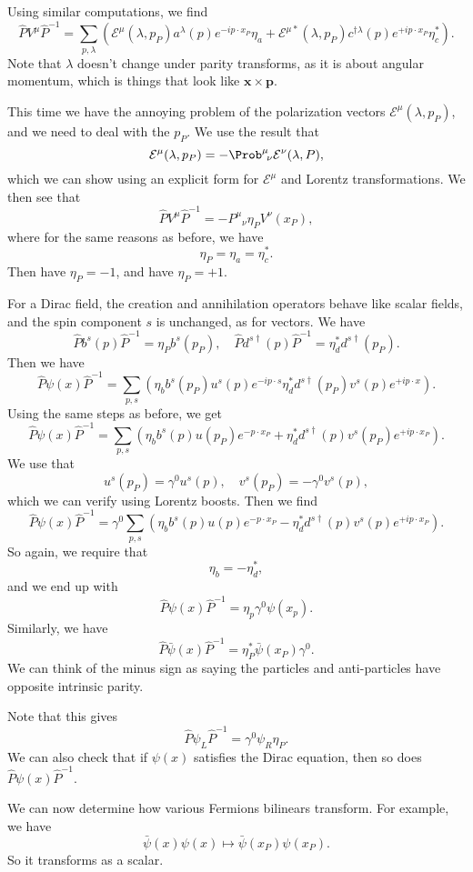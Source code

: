 \documentclass[a4paper]{article}
\begin{document}
Using similar computations, we find
\[
  \hat{P} V^\mu \hat{P}^{-1} = \sum_{p, \lambda} \left(\mathcal{E}^\mu (\lambda, p_P)a^\lambda(p) e^{-ip\cdot x_P} \eta_a + \mathcal{E}^{\mu*}(\lambda, p_P) c^{\dagger\lambda} (p) e^{+ip\cdot x_P} \eta_c^*\right).
\]
Note that $\lambda$ doesn't change under parity transforms, as it is about angular momentum, which is things that look like $\mathbf{x} \times \mathbf{p}$.

This time we have the annoying problem of the polarization vectors $\mathcal{E}^\mu(\lambda, p_P)$, and we need to deal with the $p_P$. We use the result that
\[
  \mathcal{E}^\mu(\lambda,  p_P) = - \Prob^\mu\!_\nu \mathcal{E}^\nu (\lambda, P),
\]
which we can show using an explicit form for $\mathcal{E}^\mu$ and Lorentz transformations. We then see that
\[
  \hat{P} V^\mu \hat{P}^{-1} = - P^\mu\!_\nu \eta_P V^\nu(x_P),
\]
where for the same reasons as before, we have
\[
  \eta_P = \eta_a = \eta_c^*.
\]
Then  have $\eta_P = -1$, and  have $\eta_P = +1$.

\separator

For a Dirac field, the creation and annihilation operators behave like scalar fields, and the spin component $s$ is unchanged, as for vectors. We have
\[
  \hat{P} b^s(p) \hat{P}^{-1} = \eta_P b^s(p_P),\quad \hat{P} d^{s\dagger}(p) \hat{P}^{-1} = \eta_d^* d^{s\dagger}(p_P).
\]
Then we have
\[
  \hat{P} \psi(x) \hat{P}^{-1} = \sum_{p, s} \left(\eta_b b^s(p_P) u^s(p) e^{-ip\cdot s} \eta_d^* d^{s\dagger} (p_P) v^s(p) e^{+ip\cdot x}\right).
\]
Using the same steps as before, we get
\[
  \hat{P}\psi(x) \hat{P}^{-1} = \sum_{p, s}\left( \eta_b b^s(p) u(p_P) e^{-p\cdot x_P} + \eta_d^* d^{s\dagger}(p) v^s(p_P) e^{+ip\cdot x_P}\right).
\]
We use that
\[
  u^s(p_P) = \gamma^0 u^s(p),\quad v^s(p_P) = - \gamma^0 v^s(p),
\]
which we can verify using Lorentz boosts.  Then we find
\[
  \hat{P} \psi(x) \hat{P}^{-1} = \gamma^0 \sum_{p, s}\left( \eta_b b^s(p) u(p) e^{-p\cdot x_P} - \eta_d^* d^{s\dagger}(p) v^s(p) e^{+ip\cdot x_P}\right).
\]
So again, we require that
\[
  \eta_b = - \eta_d^*,
\]
and we end up with
\[
  \hat{P} \psi(x) \hat{P}^{-1} = \eta_p \gamma^0 \psi(x_p).
\]
Similarly, we have
\[
  \hat{P} \bar\psi(x) \hat{P}^{-1} = \eta_P^* \bar\psi(x_P) \gamma^0.
\]
We can think of the minus sign as saying the particles and anti-particles have opposite intrinsic parity.

Note that this gives
\[
  \hat{P} \psi_L \hat{P}^{-1} = \gamma^0 \psi_R \eta_P.
\]
We can also check that if $\psi(x)$ satisfies the Dirac equation, then so does $\hat{P} \psi(x) \hat{P}^{-1}$.

We can now determine how various Fermions bilinears transform. For example, we have
\[
  \bar\psi(x) \psi(x) \mapsto \bar\psi(x_P) \psi(x_P).
\]
So it transforms as a scalar.
\printindex
\end{document}
